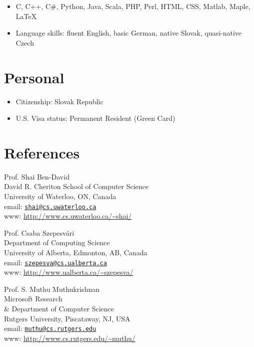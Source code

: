 \documentclass[10pt]{article}
\begin{document}
\begin{itemize}
\item C, C++, C\#, Python, Java, Scala, PHP, Perl, HTML, CSS, Matlab, Maple, LaTeX
\item Language skills: fluent English, basic German, native Slovak, quasi-native Czech
\end{itemize}

\section*{Personal}

\begin{itemize}
\item Citizenship: Slovak Republic
\item U.S. Visa status: Permanent Resident (Green Card)
\end{itemize}

\section*{References}
%
\begin{minipage}[t]{9cm}
Prof. Shai Ben-David \\
David R. Cheriton School of Computer Science \\
University of Waterloo, ON, Canada \\
email: \href{mailto:shai@cs.uwaterloo.ca}{\texttt{shai@cs.uwaterloo.ca}} \\
www: \url{http://www.cs.uwaterloo.ca/~shai/}
\end{minipage}
%
\begin{minipage}[t]{9cm}
Prof. Csaba Szepesv\'ari \\
Department of Computing Science \\
University of Alberta, Edmonton, AB, Canada \\
email: \href{mailto:szepesva@cs.ualberta.ca}{\texttt{szepesva@cs.ualberta.ca}} \\
www: \url{http://www.ualberta.ca/~szepesva/}
\end{minipage}

\vspace{1cm}

\noindent
\begin{minipage}[t]{9cm}
Prof. S. Muthu Muthukrishnan \\
Microsoft Research \\
\& Department of Computer Science \\
Rutgers University, Piscataway, NJ, USA \\
email: \href{mailto:muthu@cs.rutgers.edu}{\texttt{muthu@cs.rutgers.edu}} \\
www: \url{http://www.cs.rutgers.edu/~muthu/}
\end{minipage}
\end{document}
